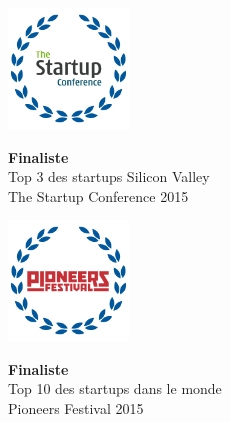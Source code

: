 \documentclass[12pt,a4paper]{report}
\begin{document}
\begin{minipage}{0.5\textwidth}

		\begin{flushleft}
		\includegraphics[width=3.2cm,height=3.2cm]{graphics/startupconferance.png}\\
		\begin{flushleft}
		 { \scriptsize  \textbf{Finaliste} \\[0.2cm]Top 3 des startups Silicon Valley\\The Startup
Conference 2015}

		\end{flushleft}

		 

		\end{flushleft}

		\end{minipage}
\begin{minipage}{0.5\textwidth}

		\begin{flushleft}
		\includegraphics[width=3.2cm,height=3.2cm]{graphics/pionnersFestival.png}\\
		\begin{flushleft}
		 { \scriptsize  \textbf{Finaliste} \\[0.2cm]Top 10 des startups dans le monde\\Pioneers Festival 2015}

		\end{flushleft}

		 

		\end{flushleft}

		\end{minipage}


\end{document}
